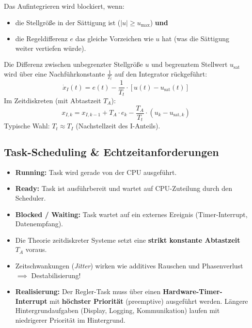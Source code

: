 \begin{tcolorbox}
Das Aufintegrieren wird blockiert, wenn:
\begin{itemize}
  \item die Stellgröße in der Sättigung ist ($|u| \ge u_{\max}$) \textbf{und}
  \item die Regeldifferenz $e$ das gleiche Vorzeichen wie $u$ hat (was die Sättigung weiter vertiefen würde).
\end{itemize}
\end{tcolorbox}

\begin{tcolorbox}
Die Differenz zwischen unbegrenzter Stellgröße $u$ und begrenztem Stellwert $u_{\text{sat}}$ wird über eine Nachführkonstante $\frac{1}{T_t}$ auf den Integrator rückgeführt:
\[
\dot{x}_I(t) = e(t) - \frac{1}{T_t} \cdot [u(t) - u_{\text{sat}}(t)]
\]
Im Zeitdiskreten (mit Abtastzeit $T_A$):
\[
x_{I,k} = x_{I,k-1} + T_A \cdot e_k - \frac{T_A}{T_t} \cdot (u_k - u_{\text{sat},k})
\]
Typische Wahl: $T_t \approx T_I$ (Nachstellzeit des I-Anteils).
\end{tcolorbox}

\subsection{Task-Scheduling \& Echtzeitanforderungen}
\begin{tcolorbox}
\begin{itemize}
  \item \textbf{Running:} Task wird gerade von der CPU ausgeführt.
  \item \textbf{Ready:} Task ist ausführbereit und wartet auf CPU-Zuteilung durch den Scheduler.
  \item \textbf{Blocked / Waiting:} Task wartet auf ein externes Ereignis (Timer-Interrupt, Datenempfang).
\end{itemize}
\end{tcolorbox}

\begin{tcolorbox}
\begin{itemize}
  \item Die Theorie zeitdiskreter Systeme setzt eine \textbf{strikt konstante Abtastzeit $T_A$} voraus.
  \item Zeitschwankungen (\textit{Jitter}) wirken wie additives Rauschen und Phasenverlust $\implies$ Destabilisierung!
  \item \textbf{Realisierung:} Der Regler-Task muss über einen \textbf{Hardware-Timer-Interrupt} mit \textbf{höchster Priorität} (preemptive) ausgeführt werden. Längere Hintergrundaufgaben (Display, Logging, Kommunikation) laufen mit niedrigerer Priorität im Hintergrund.
\end{itemize}
\end{tcolorbox}
